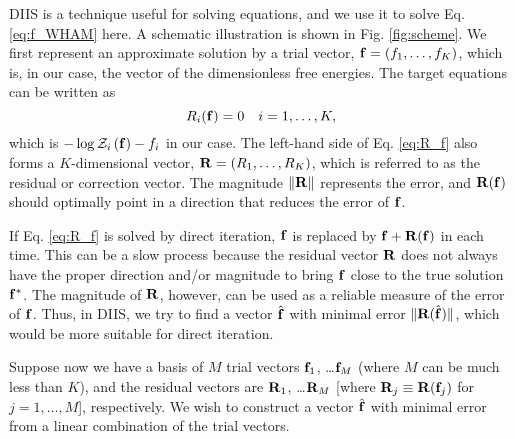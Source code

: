 \documentclass{gMOS2e}
\begin{document}
DIIS is a technique useful for solving equations\cite{
pulay1980, pulay1982, hamilton1986,
kovalenko1999, howard2011},
and we use it
to solve Eq. \eqref{eq:f_WHAM} here.
%
A schematic illustration
is shown in Fig. \ref{fig:scheme}.
%
We first represent an approximate solution
by a trial vector,
$\mathbf{f} = (f_1, \dots, f_K)$,
which is, in our case, the vector of
the dimensionless free energies.
%
The target equations can be written as
%
\begin{equation}
  R_i(\mathbf{f}) = 0  \quad i = 1, \ldots, K,
  \label{eq:R_f}
\end{equation}
%
which is
$-\log \mathcal{Z}_i\left( \mathbf{f} \right) - f_i$
in our case.
%
The left-hand side of Eq. \eqref{eq:R_f}
also forms a $K$-dimensional vector,
$\mathbf{R} = (R_1, \dots, R_K)$,
which is referred to as the residual or correction vector.
%
The magnitude
$\| \mathbf{R} \|$
represents the error,
%
and
$\mathbf{R}(\mathbf{f})$
should optimally point in a direction
that reduces the error of $\mathbf{f}$.
%



If Eq. \eqref{eq:R_f} is solved
by direct iteration,
$\mathbf{f}$ is replaced by $\mathbf{f} + \mathbf{R}(\mathbf{f})$
in each time.
%
This can be a slow process
because the residual vector $\mathbf{R}$
does not always have
the proper direction and/or magnitude
to bring $\mathbf{f}$
close to the true solution $\mathbf{f}^*$.
%
The magnitude of $\mathbf{R}$, however,
can be used as a reliable measure
of the error of $\mathbf{f}$.
%
Thus, in DIIS, we try to find a vector $\hat{\mathbf{f}}$
with minimal error $\| \mathbf{R}(\hat{\mathbf{f}}) \|$,
which would be more suitable
for direct iteration.



Suppose now we have a basis of $M$ trial vectors
$\mathbf{f}_1$, \dots $\mathbf{f}_M$
(where $M$ can be much less than $K$),
%
and the residual vectors are
$\mathbf{R}_1$, \dots $\mathbf{R}_M$
[where $\mathbf{R}_j \equiv \mathbf{R}(\mathbf{f}_j)$
for $j = 1, \dots, M$],
respectively.
%
We wish to construct a vector $\hat{\mathbf{f}}$
with minimal error
from a linear combination of the trial vectors.
\end{document}
